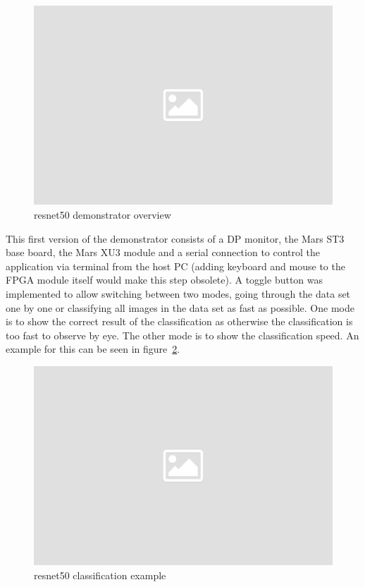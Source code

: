 \begin{figure}[!htb]
	\centering
		\includegraphics[width=\textwidth]{bilder/placeholder.png}
		\caption{resnet50 demonstrator overview}
		\label{fig:st3_demo_resnet}
\end{figure}
This first version of the demonstrator consists of a \ac{DP} monitor, the Mars ST3 base board, the Mars XU3 module and a serial connection to control the application via terminal from the host PC (adding keyboard and mouse to the \ac{FPGA} module itself would make this step obsolete).
A toggle button was implemented to allow switching between two modes, going through the data set one by one or classifying all images in the data set as fast as possible. One mode is to show the correct result of the classification as otherwise the classification is too fast to observe by eye. The other mode is to show the classification speed. An example for this can be seen in figure~\ref{fig:resnet_classification}.
\begin{figure}[!htb]
	\centering
		\includegraphics[width=\textwidth]{bilder/placeholder.png}
		\caption{resnet50 classification example}
		\label{fig:resnet_classification}
\end{figure}

